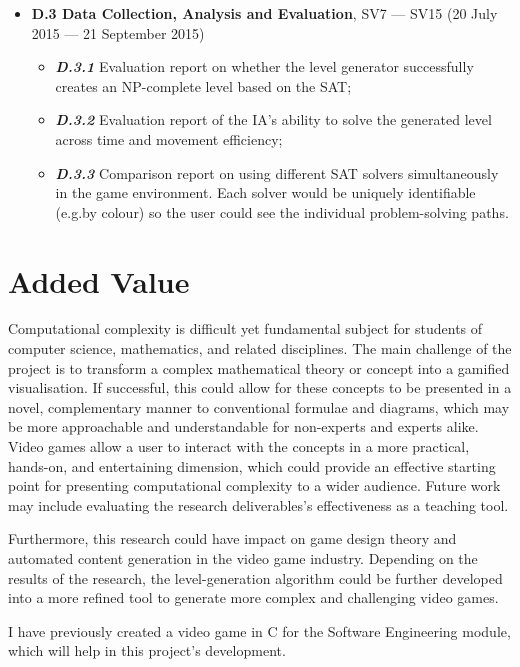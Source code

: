 \documentclass[a4paper]{article}
\begin{document}
\begin{itemize}
\begin{itemize}
    \end{itemize}
  \item \textbf{D.3 Data Collection, Analysis and Evaluation}, SV7 --- SV15 (20 July 2015 --- 21 September 2015)
      \begin{itemize} 
      \item \textbf{\textit{D.3.1}} Evaluation report on whether the level generator successfully creates an NP-complete level based on the SAT;\@
      \item \textbf{\textit{D.3.2}} Evaluation report of the IA's ability to solve the generated level across time and movement efficiency;\@
      \item \textbf{\textit{D.3.3}} Comparison report on using different SAT solvers simultaneously in the game environment. Each solver would be uniquely identifiable (e.g.\@ by colour) so the user could see the individual problem-solving paths. 
    \end{itemize}
\end{itemize}
\vspace{-7mm}

\section{Added Value}
\vspace{-5mm}
Computational complexity is difficult yet fundamental subject for students of computer science, mathematics, and related disciplines. The main challenge of the project is to transform a complex mathematical theory or concept into a gamified visualisation. If successful, this could allow for these concepts to be presented in a novel, complementary manner to conventional formulae and diagrams, which may be more approachable and understandable for non-experts and experts alike. Video games allow a user to interact with the concepts in a more practical, hands-on, and entertaining dimension, which could provide an effective starting point for presenting computational complexity to a wider audience. Future work may include evaluating the research deliverables's effectiveness as a teaching tool.
\par \noindent Furthermore, this research could have impact on game design theory and automated content generation in the video game industry. Depending on the results of the research, the level-generation algorithm could be further developed into a more refined tool to generate more complex and challenging video games.
\par \noindent I have previously created a video game in C for the Software Engineering module, which will help in this project's development. 
\end{document}
